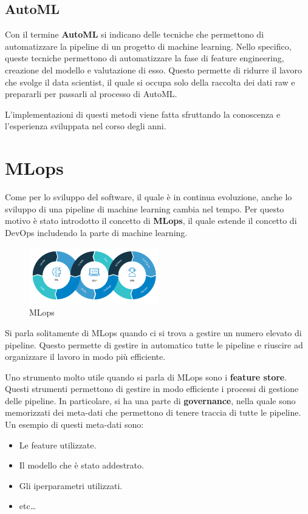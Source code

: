 \subsection{AutoML}
Con il termine \textbf{AutoML} si indicano delle tecniche che permettono di
automatizzare la pipeline di un progetto di machine learning. Nello specifico,
queste tecniche permettono di automatizzare la fase di feature engineering,
creazione del modello e valutazione di esso. Questo permette di ridurre il lavoro
che svolge il data scientist, il quale si occupa solo della raccolta dei dati raw
e prepararli per passarli al processo di AutoML.

L'implementazioni di questi metodi viene fatta sfruttando la conoscenza e
l'esperienza sviluppata nel corso degli anni.
\section{MLops}
Come per lo sviluppo del software, il quale è in continua evoluzione, anche lo
sviluppo di una pipeline di machine learning cambia nel tempo. Per questo motivo
è stato introdotto il concetto di \textbf{MLops}, il quale estende il concetto di
DevOps includendo la parte di machine learning.
\begin{figure}[!ht]
      \centering
      \includegraphics[width=0.5\textwidth]{./img/MLops/mlops.png}
      \caption{MLops}
      \label{fig:mlops}
\end{figure}
\begin{nota}
      Si parla solitamente di MLops quando ci si trova a gestire un numero elevato
      di pipeline. Questo permette di gestire in automatico tutte le pipeline e
      riuscire ad organizzare il lavoro in modo più efficiente.
\end{nota}

Uno strumento molto utile quando si parla di MLops sono i \textbf{feature store}.
Questi strumenti permettono di gestire in modo efficiente i processi di gestione
delle pipeline. In particolare, si ha una parte di \textbf{governance}, nella
quale sono memorizzati dei meta-dati che permettono di tenere traccia di tutte
le pipeline. Un esempio di questi meta-dati sono:
\begin{itemize}
      \item Le feature utilizzate.
      \item Il modello che è stato addestrato.
      \item Gli iperparametri utilizzati.
      \item etc\dots
\end{itemize}
